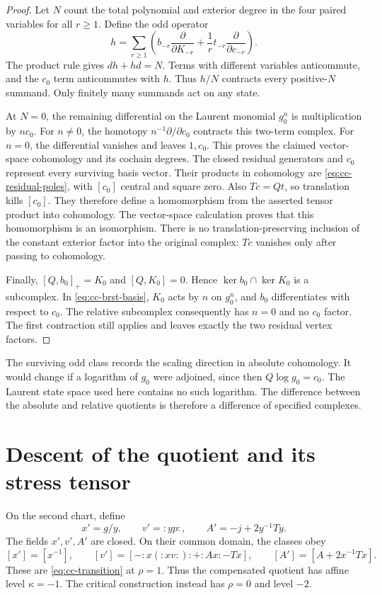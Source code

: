 \begin{proof}
Let $N$ count the total polynomial and exterior degree in the four paired variables for all $r\geq1$.
Define the odd operator
\[
 h=\sum_{r\geq1}\left(
 b_{-r}\frac{\partial}{\partial K_{-r}}
 +\frac1r t_{-r}\frac{\partial}{\partial c_{-r}}\right).
\]
The product rule gives $dh+hd=N$.
Terms with different variables anticommute, and the $c_0$ term anticommutes with $h$.
Thus $h/N$ contracts every positive-$N$ summand.
Only finitely many summands act on any state.

At $N=0$, the remaining differential on the Laurent monomial $g_0^n$ is multiplication by $n c_0$.
For $n\ne0$, the homotopy $n^{-1}\partial/\partial c_0$ contracts this two-term complex.
For $n=0$, the differential vanishes and leaves $1,c_0$.
This proves the claimed vector-space cohomology and its cochain degrees.
The closed residual generators and $c_0$ represent every surviving basis vector.
Their products in cohomology are \eqref{eq:cc-residual-poles}, with $[c_0]$ central and square zero.
Also $Tc=Qt$, so translation kills $[c_0]$.
They therefore define a homomorphism from the asserted tensor product into cohomology.
The vector-space calculation proves that this homomorphism is an isomorphism.
There is no translation-preserving inclusion of the constant exterior factor into the original complex: $Tc$ vanishes only after passing to cohomology.

Finally, $[Q,b_0]_+=K_0$ and $[Q,K_0]=0$.
Hence $\ker b_0\cap\ker K_0$ is a subcomplex.
In \eqref{eq:cc-brst-basis}, $K_0$ acts by $n$ on $g_0^n$, and $b_0$ differentiates with respect to $c_0$.
The relative subcomplex consequently has $n=0$ and no $c_0$ factor.
The first contraction still applies and leaves exactly the two residual vertex factors.
\end{proof}

The surviving odd class records the scaling direction in absolute cohomology.
It would change if a logarithm of $g_0$ were adjoined, since then $Q\log g_0=c_0$.
The Laurent state space used here contains no such logarithm.
The difference between the absolute and relative quotients is therefore a difference of specified complexes.

\section{Descent of the quotient and its stress tensor}

On the second chart, define
\[
 x'=g/y,\qquad v'=:yp:,\qquad A'=-j+2y^{-1}Ty.
\]
The fields $x',v',A'$ are closed.
On their common domain, the classes obey
\begin{equation}\label{eq:cc-gauged-overlap}
 [x']=[x^{-1}],\qquad
 [v']=[-:x(:xv:):+:Ax:-Tx],\qquad
 [A']=[A+2x^{-1}Tx].
\end{equation}
These are \eqref{eq:cc-transition} at $\rho=1$.
Thus the compensated quotient has affine level $\kappa=-1$.
The critical construction instead has $\rho=0$ and level $-2$.

